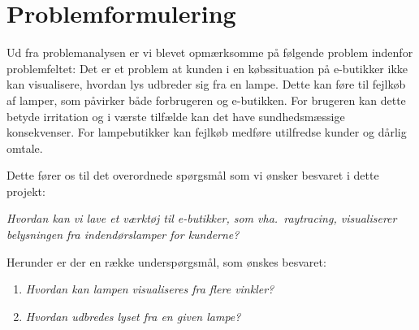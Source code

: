 \section{Problemformulering}

Ud fra problemanalysen er vi blevet opmærksomme på følgende problem indenfor problemfeltet:
Det er et problem at kunden i en købssituation på e-butikker ikke kan visualisere, hvordan lys udbreder sig fra en lampe. Dette kan føre til fejlkøb af lamper, som påvirker både forbrugeren og e-butikken. For brugeren kan dette betyde irritation og i værste tilfælde kan det have sundhedsmæssige konsekvenser. For lampebutikker kan fejlkøb medføre utilfredse kunder og dårlig omtale. 

Dette fører os til det overordnede spørgsmål som vi ønsker besvaret i dette projekt:

\textit{Hvordan kan vi lave et værktøj til e-butikker, som vha.\ raytracing, visualiserer belysningen fra indendørslamper for kunderne?}

Herunder er der en række underspørgsmål, som ønskes besvaret:

\begin{enumerate}

\item \textit{Hvordan kan lampen visualiseres fra flere vinkler?}
\item \textit{Hvordan udbredes lyset fra en given lampe?}

\end{enumerate}